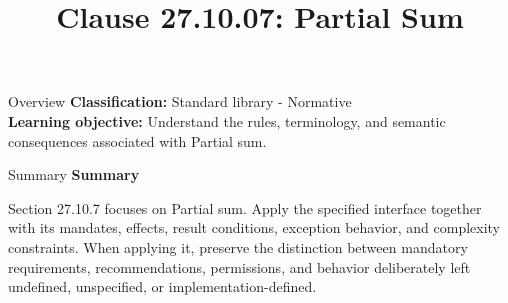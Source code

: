 \documentclass[10pt,letterpaper]{article}
\title{Clause 27.10.07: Partial Sum}
\author{}
\date{}
\begin{document}
\maketitle
\begin{CornellOverviewBox}{Overview}
\textbf{Classification:} Standard library - Normative\\[2pt]
\textbf{Learning objective:} Understand the rules, terminology, and semantic consequences associated with Partial sum.
\end{CornellOverviewBox}\begin{CornellSummaryBox}{Summary}
{\sffamily\bfseries\color{Accent} Summary}\par\vspace{3pt}Section 27.10.7 focuses on Partial sum. Apply the specified interface together with its mandates, effects, result conditions, exception behavior, and complexity constraints. When applying it, preserve the distinction between mandatory requirements, recommendations, permissions, and behavior deliberately left undefined, unspecified, or implementation-defined.
\end{CornellSummaryBox}
\end{document}
